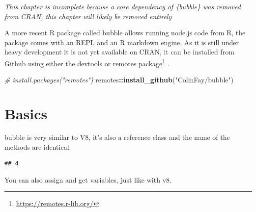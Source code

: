 \documentclass[
]{krantz}
\makeatletter
\newenvironment{Shaded}{\begin{snugshade}}{\end{snugshade}}
\newcommand{\CommentTok}[1]{\textcolor[rgb]{0.37,0.37,0.37}{\textit{#1}}}
\newcommand{\DecValTok}[1]{\textcolor[rgb]{0.06,0.06,0.06}{#1}}
\newcommand{\KeywordTok}[1]{\textcolor[rgb]{0.27,0.27,0.27}{\textbf{#1}}}
\newcommand{\NormalTok}[1]{#1}
\newcommand{\OperatorTok}[1]{\textcolor[rgb]{0.43,0.43,0.43}{\textbf{#1}}}
\newcommand{\StringTok}[1]{\textcolor[rgb]{0.5,0.5,0.5}{#1}}
\renewcommand{\href}[2]{#2\footnote{\url{#1}}}
\newenvironment{kframe}{%
\medskip{}
\setlength{\fboxsep}{.8em}
 \def\at@end@of@kframe{}%
 \ifinner\ifhmode%
  \def\at@end@of@kframe{\end{minipage}}%
  \begin{minipage}{\columnwidth}%
 \fi\fi%
 \def\FrameCommand##1{\hskip\@totalleftmargin \hskip-\fboxsep
 \colorbox{shadecolor}{##1}\hskip-\fboxsep
     \hskip-\linewidth \hskip-\@totalleftmargin \hskip\columnwidth}%
 \MakeFramed {\advance\hsize-\width
   \@totalleftmargin\z@ \linewidth\hsize
   \@setminipage}}%
 {\par\unskip\endMakeFramed%
 \at@end@of@kframe}
\renewenvironment{Shaded}{\begin{kframe}}{\end{kframe}}
\makeatother
\begin{document}
\emph{This chapter is incomplete because a core dependency of \{bubble\} was removed from CRAN, this chapter will likely be removed entirely}

A more recent R package called bubble allows running node.js code from R, the package comes with an REPL and an R markdown engine. As it is still under heavy development it is not yet available on CRAN, it can be installed from Github using either the devtools or \href{https://remotes.r-lib.org/}{remotes package} \citep{R-remotes}.

\begin{Shaded}
\begin{Highlighting}[]
\CommentTok{\# install.packages("remotes")}
\NormalTok{remotes}\OperatorTok{::}\KeywordTok{install\_github}\NormalTok{(}\StringTok{"ColinFay/bubble"}\NormalTok{)}
\end{Highlighting}
\end{Shaded}

\hypertarget{basics-2}{%
\section*{Basics}\label{basics-2}}


bubble is very similar to V8, it's also a reference class and the name of the methods are identical.

\begin{Shaded}
\end{Shaded}

\begin{verbatim}
## 4
\end{verbatim}

You can also assign and get variables, just like with v8.

\begin{Shaded}
\end{Shaded}
\end{document}
